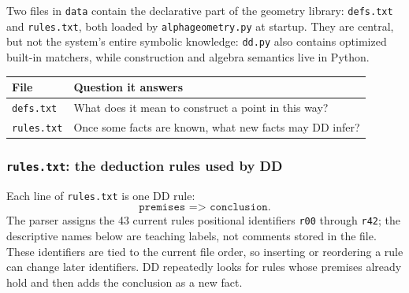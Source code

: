 \documentclass[reqno]{amsart}
\DeclareMathOperator{\1}{\textbf{1}}
\begin{document}
Two files in \verb|data| contain the declarative part of the geometry library:
\verb|defs.txt| and \verb|rules.txt|, both loaded by
\verb|alphageometry.py| at startup. They are central, but not the system's
entire symbolic knowledge: \verb|dd.py| also contains optimized built-in
matchers, while construction and algebra semantics live in Python.

\begin{center}
\begin{tabular}{p{}p{}}
\textbf{File} & \textbf{Question it answers} \\
\hline
\texttt{defs.txt} & What does it mean to construct a point in this way? \\
\texttt{rules.txt} & Once some facts are known, what new facts may DD infer? \\
\end{tabular}
\end{center}

\subsubsection{\texttt{rules.txt}: the deduction rules used by DD}

Each line of \verb|rules.txt| is one DD rule:
\[
\texttt{premises => conclusion}.
\]
The parser assigns the 43 current rules positional identifiers
\verb|r00| through \verb|r42|; the descriptive names below are teaching
labels, not comments stored in the file.  These identifiers are tied to the
current file order, so inserting or reordering a rule can change later
identifiers. DD repeatedly looks for rules whose
premises already hold and then adds the conclusion as a new fact.
\end{document}
